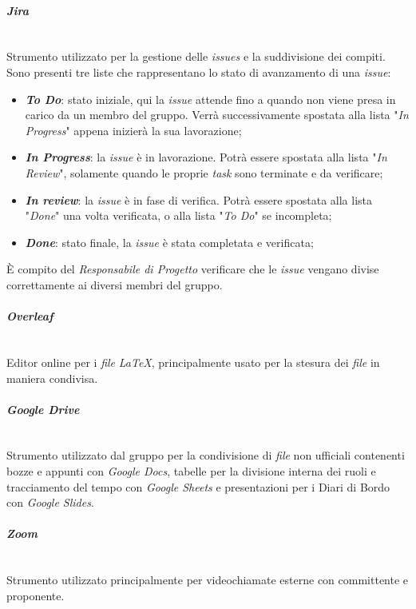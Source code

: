 \documentclass[5pt]{article}
\begin{document}
\paragraph{\textit{Jira}}~\\
Strumento utilizzato per la gestione delle \textit{issues} e la suddivisione dei compiti. Sono presenti tre liste che rappresentano lo stato di avanzamento di una \textit{issue}:
\begin{itemize} 
    \item\textbf{\textit{To Do}}: stato iniziale, qui la \textit{issue} attende fino a quando non viene presa in carico da un membro del gruppo. Verrà successivamente spostata alla lista "\textit{In Progress}" appena inizierà la sua lavorazione;
    \item\textbf{\textit{In Progress}}: la \textit{issue} è in lavorazione. Potrà essere spostata alla lista "\textit{In Review}", solamente quando le proprie \textit{task} sono terminate e da verificare;
    \item\textbf{\textit{In review}}: la \textit{issue} è in fase di verifica. Potrà essere spostata alla lista "\textit{Done}" una volta verificata, o alla lista "\textit{To Do}" se incompleta;
    \item\textbf{\textit{Done}}: stato finale, la \textit{issue} è stata completata e verificata;
\end{itemize}
È compito del \textit{Responsabile di Progetto} verificare che le \textit{issue} vengano divise correttamente ai diversi membri del gruppo. 
\paragraph{\textit{Overleaf}}~\\
Editor online per i \textit{file} \textit{LaTeX}, principalmente usato per la stesura dei \textit{file} in maniera condivisa.
\paragraph{\textit{Google Drive}}~\\
Strumento utilizzato dal gruppo per la condivisione di \textit{file} non ufficiali contenenti bozze e appunti con \textit{Google Docs}, tabelle per la divisione interna dei ruoli e tracciamento del tempo con \textit{Google Sheets} e presentazioni per i Diari di Bordo con \textit{Google Slides}. 
\paragraph{\textit{Zoom}}~\\
Strumento utilizzato principalmente per videochiamate esterne con committente e proponente.
\end{document}
